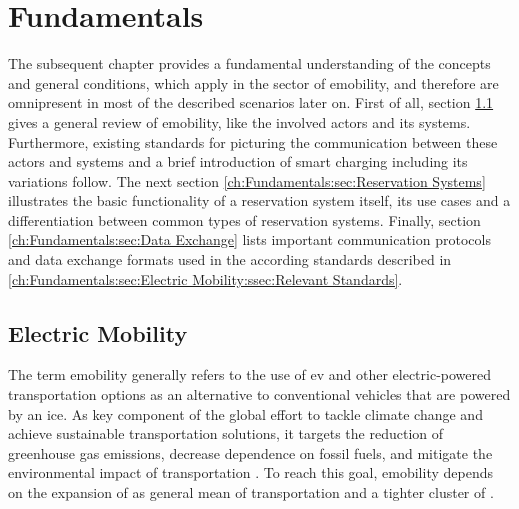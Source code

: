 

\chapter{Fundamentals}
\label{ch:Fundamentals}

The subsequent chapter provides a fundamental understanding of the concepts and general conditions, which apply in the sector of \gls{emobility}, and therefore are omnipresent in most of the described scenarios later on.
First of all, section \ref{ch:Fundamentals:sec:Electric Mobility} gives a general review of \gls{emobility}, like the involved actors and its systems. Furthermore, existing standards for picturing the communication between these actors and systems and a brief introduction of smart charging including its variations follow.
The next section \ref{ch:Fundamentals:sec:Reservation Systems} illustrates the basic functionality of a reservation system itself, its use cases and a differentiation between common types of reservation systems.
Finally, section \ref{ch:Fundamentals:sec:Data Exchange} lists important communication protocols and data exchange formats used in the according standards described in \ref{ch:Fundamentals:sec:Electric Mobility:ssec:Relevant Standards}.

\section{Electric Mobility}
\label{ch:Fundamentals:sec:Electric Mobility}

The term \Gls{emobility} generally refers to the use of \acrfull{ev} and other electric-powered transportation options as an alternative to conventional vehicles that are powered by an \acrfull{ice}. 
As key component of the global effort to tackle climate change and achieve sustainable transportation solutions, it targets the reduction of greenhouse gas emissions, decrease dependence on fossil fuels, and mitigate the environmental impact of transportation \cite{kathiresh_e-mobility_2022}.
To reach this goal, \Gls{emobility} depends on the expansion of  as general mean of transportation and a tighter cluster of .


